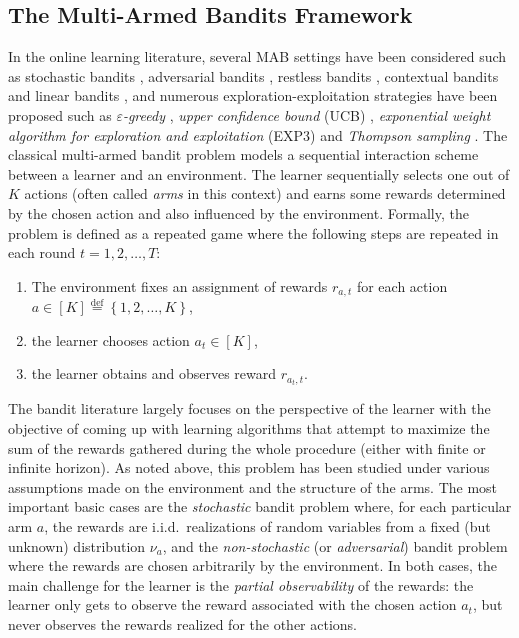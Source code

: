 \documentclass[preprint,12pt]{elsarticle}
\begin{document}
	\subsection{The Multi-Armed Bandits Framework}
	In the online learning literature, several MAB settings have been considered such as stochastic bandits \cite{thompson1933likelihood,lai1985asymptotically,auer2002finite}, adversarial bandits \cite{auer1995gambling,auer2002nonstochastic}, restless bandits \cite{whittle1988restless}, contextual bandits \cite{LCLS10} and linear bandits \cite{abe2003reinforcement,APS11}, and numerous exploration-exploitation strategies have been proposed such as \textit{$\varepsilon$-greedy} \cite{sutton1998reinforcement,auer2002finite}, \textit{upper confidence bound} (UCB) \cite{lai1985asymptotically,Agr95,BuKa96,auer2002finite}, \textit{exponential weight algorithm for exploration and exploitation} (EXP3) \cite{auer1995gambling,auer2002finite} and \textit{Thompson sampling} \cite{thompson1933likelihood}. The classical multi-armed bandit problem models a sequential interaction scheme between a learner and an environment. The learner sequentially selects one out of $K$ actions (often called \emph{arms} in this context) and earns some rewards determined by the chosen action and also influenced by the environment. Formally, the problem 
	is defined as a repeated game where the following steps are repeated in each round $t=1,2,\dots,T$:
	\begin{enumerate}
		\item The environment fixes an assignment of rewards $r_{a,t}$ for each action $a\in[K] \stackrel{\text{def}}{=} \left\{1,2,\dots,K\right\}$,
		\item the learner chooses action $a_t\in[K]$,
		\item the learner obtains and observes reward $r_{a_t,t}$.
	\end{enumerate}
	The bandit literature largely focuses on the perspective of the learner with the objective of coming up with learning algorithms that attempt to maximize the sum of the rewards gathered during the whole procedure (either with finite or infinite horizon). As noted above, this problem has been studied under various assumptions made on the environment and the structure of the arms. The most important basic cases are the \emph{stochastic} bandit problem where, for each particular arm $a$, the rewards are i.i.d.~realizations of random variables from a fixed (but unknown) distribution $\nu_a$, and the \emph{non-stochastic} (or \emph{adversarial}) bandit problem where the rewards are chosen arbitrarily by the environment. In both cases, the main challenge for the learner is the \emph{partial observability} of the rewards: the learner only gets to observe the reward associated with the chosen action $a_t$, but never observes the rewards realized for the other actions.
	
\end{document}
